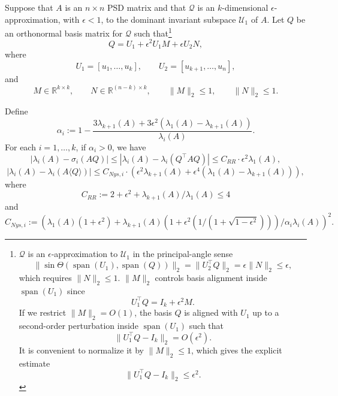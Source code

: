 \documentclass[onefignum,onetabnum]{siamart251216}
\def\subspace{\mathcal{Q}}
\def\leadingsubspace{\mathcal{U}_1}
\def\realR{\mathbb{R}}
\newcommand{\image}{\operatorname{span}}
\begin{document}
\begin{theorem}
    \label{thm:Higher-order-accuracy-Nystrom-theorem}
    Suppose that $A$ is an $n \times n$ PSD matrix and that $\subspace$ is an $k$-dimensional $\epsilon$-approximation, with $\epsilon < 1$, to the dominant invariant subspace $\leadingsubspace$ of $A$. Let $Q$ be an orthonormal basis matrix for $\subspace$ such that\footnote{$\subspace$ is an $\epsilon$-approximation to $\leadingsubspace$ in the principal-angle sense
    \[
    \|\sin \Theta(\image(U_1), \image(Q))\|_2 = \|U_2^\top Q\|_2 = \epsilon \|N\|_2 \leq \epsilon,
    \]
    which requires $\|N\|_2 \leq 1$. $\|M\|_2$ controls basis alignment inside $\image(U_1)$ since
    \[
    U_1^\top Q = I_k + \epsilon^2 M.
    \]
    If we restrict $\|M\|_2 = O(1)$, the basis $Q$ is aligned with $U_1$ up to a second-order perturbation inside $\image(U_1)$ such that
    \[
    \|U_1^\top Q - I_k\|_2 = O(\epsilon^2).
    \]
    It is convenient to normalize it by $\|M\|_2 \leq 1$, which gives the explicit estimate
    \[
    \|U_1^\top Q - I_k\|_2 \leq \epsilon^2.
    \]
    }
    \begin{equation}
        \label{eq:eps-approximation-Q-formula}
        Q = U_1 + \epsilon^2 U_1 M + \epsilon U_2 N,
    \end{equation}
    where
    \[
        U_1 = [u_1,\ldots,u_k], 
        \qquad
        U_2 = [u_{k+1},\ldots,u_n],
    \]
    and
    \[
        M \in \realR^{k \times k}, 
        \qquad
        N \in \realR^{(n-k) \times k},
        \qquad
        \|M\|_2 \leq 1, 
        \qquad
        \|N\|_2 \leq 1 .
    \]

    Define 
        \[
\alpha_i :=   1-\frac{  3\lambda_{k+1}(A) + 3 \epsilon^2 (\lambda_1(A) - \lambda_{k+1}(A))}{\lambda_i(A)} . 
    \]
    For each $i=1,\ldots, k$, if 
    $\alpha_i>0$, we have
    \begin{equation}
        \label{eq:Upper-bound-RR}
        \left|\lambda_{i}(A) - \sigma_i(AQ)\right| \leq \left|\lambda_{i}(A) - \lambda_i(Q^\top A Q)\right| \leq C_{RR} \cdot \epsilon^2 \lambda_{1}(A),
    \end{equation}
    \begin{equation}
        \label{eq:Upper-bound-Nys}
        \left| \lambda_{i}(A) - \lambda_{i}(A \langle Q \rangle) \right| \leq C_{Nys,i} \cdot \left(\epsilon^2\lambda_{k+1}(A) + \epsilon^4 (\lambda_1(A) - \lambda_{k+1}(A))\right),
    \end{equation}
    where 
    \[
        C_{RR} := 2 + \epsilon^2 + \lambda_{k+1}(A) / \lambda_1(A) \leq 4
    \]
    and
    \[
        C_{Nys, i} := \left(\lambda_1(A) (1+ \epsilon^2) + \lambda_{k+1}(A) \left(1 + \epsilon^2 \left(1 / \left(1 + \sqrt{1-\epsilon^2}\right)\right)\right) / \alpha_{i} \lambda_i(A)\right)^2.
    \]
\end{theorem}
\end{document}
